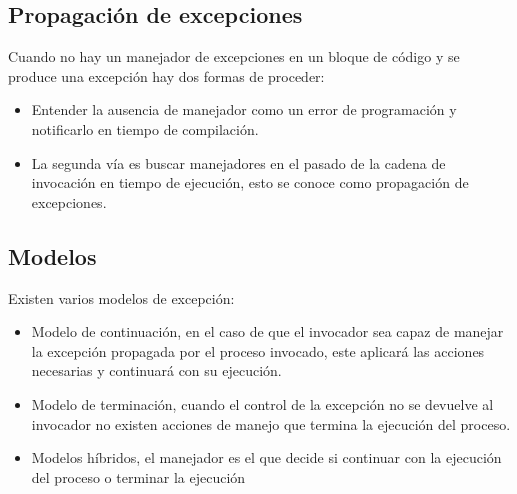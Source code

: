\subsection{Propagación de excepciones}

Cuando no hay un manejador de excepciones en un bloque de código y se produce
una excepción hay dos formas de proceder:

\begin{itemize}
	\item Entender la ausencia de manejador como un error de programación y
		notificarlo en tiempo de compilación.
	\item La segunda vía es buscar manejadores en el pasado de la cadena de
		invocación en tiempo de ejecución, esto se conoce como
		propagación de excepciones.
\end{itemize}

\subsection{Modelos}

Existen varios modelos de excepción:

\begin{itemize}
	\item Modelo de continuación, en el caso de que el invocador sea capaz
		de manejar la excepción propagada por el proceso invocado, este
		aplicará las acciones necesarias y continuará con su ejecución.
	\item Modelo de terminación, cuando el control de la excepción no se
		devuelve al invocador no existen acciones de manejo que termina
		la ejecución del proceso.
	\item Modelos híbridos, el manejador es el que decide si continuar con
		la ejecución del proceso o terminar la ejecución
\end{itemize}
